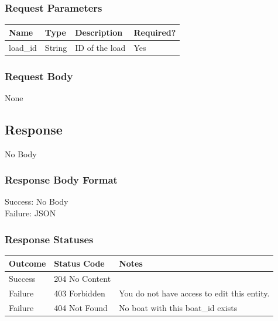\documentclass[letterpaper,11pt,titlepage,draftclsnofoot,onecolumn,compsoc,utf8,latin1]{IEEEtran}
\begin{document}
\begin{singlespace}
\subsubsection{Request Parameters}

\begin{center}
    \begin{tabular}{ | p{} | p{} | p{} | p{} |}
    \hline
        \textbf{Name} & \textbf{Type} & \textbf{Description} &\textbf{Required?}  \\ \hline
        load\_id & String & ID of the load & Yes \\
    \hline
    \end{tabular}
\end{center}

\subsubsection{Request Body}

None

\subsection{Response}

No Body

\subsubsection{Response Body Format}
Success: No Body\\
\noindent Failure: JSON

\subsubsection{Response Statuses}

\begin{center}
\begin{tabular}{ |p{}|p{}|p{}| } 
 \hline
 \textbf{Outcome} & \textbf{Status Code} & \textbf{Notes}  \\  \hline
 Success & 204 No Content &  \\ \hline
 Failure & 403 Forbidden & You do not have access to edit this entity. \\ \hline
 Failure & 404 Not Found & No boat with this boat\_id exists \\
 \hline
\end{tabular}
\end{center}


\end{singlespace}
\end{document}

